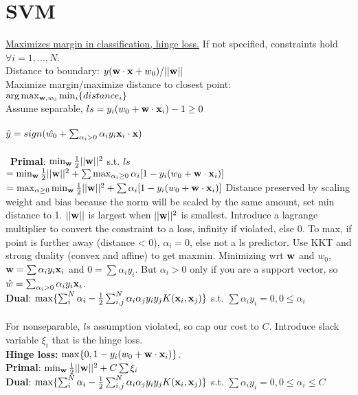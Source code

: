 \section{SVM}
\underline{Maximizes margin in classification, hinge loss.} If not specified, constraints hold $\forall i=1,\dots, N$.\\
Distance to boundary: $y({\textrm{\textbf{w}}}\cdot {\textrm{\textbf{x}}} + w_0)/||{\textrm{\textbf{w}}}||$\\
Maximize margin/maximize distance to closest point: $\arg \max_{{\textrm{\textbf{w}}}, w_0} \min_i \{distance_i\}$\\
Assume separable, $ls = y_i(w_0 + {\textrm{\textbf{w}}}\cdot {\textrm{\textbf{x}}}_i) - 1 \geq 0$\\\\
$\hat{y} = sign(\hat{w_0} + \sum_{\alpha_i > 0} \alpha_iy_i{\textrm{\textbf{x}}}_i\cdot {\textrm{\textbf{x}}})$\\\\\
\textbf{Primal}: $\min_{{\textrm{\textbf{w}}}}\frac{1}{2}||{\textrm{\textbf{w}}}||^2$ s.t. $ls$\\
$= \min_{{\textrm{\textbf{w}}}} \frac{1}{2}||{\textrm{\textbf{w}}}||^2 + \sum \max_{\alpha_i \geq 0} \alpha_i[1-y_i(w_0 + {\textrm{\textbf{w}}}\cdot {\textrm{\textbf{x}}}_i)]$\\
$= \max_{\alpha \geq 0} \min_{{\textrm{\textbf{w}}}} \frac{1}{2}||{\textrm{\textbf{w}}}||^2 + \sum  \alpha_i[1-y_i(w_0 + {\textrm{\textbf{w}}}\cdot {\textrm{\textbf{x}}}_i)]$
Distance preserved by scaling weight and bias because the norm will be scaled by the same amount, set min distance to 1. $||{\textrm{\textbf{w}}}||$ is largest when $||{\textrm{\textbf{w}}}||^2$ is smallest.  Introduce a lagrange multiplier to convert the constraint to a loss, infinity if violated, else 0. To max, if point is further away (distance < 0), $\alpha_i = 0$, else not a ls predictor. Use KKT and strong duality (convex and affine) to get maxmin. Minimizing wrt ${\textrm{\textbf{w}}}$ and $w_0$,
${\textrm{\textbf{w}}} = \sum \alpha_i y_i {\textrm{\textbf{x}}}_i$ and $0 = \sum \alpha_i y_i$. But $\alpha_i>0$ only if you are a support vector, so $\hat{w}= \sum_{\alpha_i > 0} \alpha_iy_i{\textrm{\textbf{x}}}_i$.\\
\textbf{Dual}: $\max\{\sum_i^N \alpha_i - \frac{1}{2}\sum_{i,j}^{N} \alpha_i \alpha_j y_i y_j K({\textrm{\textbf{x}}}_i, {\textrm{\textbf{x}}}_j)\}$ s.t. $\sum \alpha_iy_i = 0, 0\leq \alpha_i$\\\\
For nonseparable, $ls$ assumption violated, so cap our cost to $C$. Introduce slack variable $\xi_i$ that is the hinge loss.\\
\textbf{Hinge loss:} $\max\{0, 1-y_i(w_0 + {\textrm{\textbf{w}}}\cdot {\textrm{\textbf{x}}}_i)\}$.\\
\textbf{Primal}: $\min_{{\textrm{\textbf{w}}}}\frac{1}{2}||{\textrm{\textbf{w}}}||^2 + C\sum \xi_i$\\
\textbf{Dual}: $\max\{\sum_i^N \alpha_i - \frac{1}{2}\sum_{i,j}^{N} \alpha_i \alpha_j y_i y_j K({\textrm{\textbf{x}}}_i, {\textrm{\textbf{x}}}_j)\}$ s.t. $\sum \alpha_iy_i = 0, 0\leq \alpha_i \leq C$\\\\
